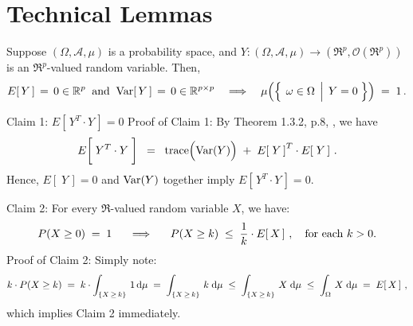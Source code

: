 

\section{Technical Lemmas}
\setcounter{theorem}{0}
\setcounter{equation}{0}

\renewcommand{\theenumi}{\roman{enumi}}
\renewcommand{\labelenumi}{\textnormal{(\theenumi)}$\;\;$}

\begin{lemma}
\mbox{}\vskip 0.05cm
\noindent
Suppose $(\Omega,\mathcal{A},\mu)$ is a probability space, and
$Y : (\Omega,\mathcal{A},\mu) \longrightarrow (\Re^{p},\mathcal{O}(\Re^{p}))$
is an $\Re^{p}$-valued random variable.
Then,
\begin{equation*}
E\!\left[\,Y\,\right] \,=\, 0 \in \Re^{p}
\;\;\textnormal{and}\;\;
\Var\!\left[\,Y\,\right] \,=\, 0 \in \Re^{p \times p}
\quad\Longrightarrow\quad
\mu\!\left(\left\{\;\left.\omega\overset{{\color{white}.}}{\in}\Omega\,\;\right\vert\;Y = 0\;\right\}\right) \;=\;1\,.
\end{equation*}
\end{lemma}
\proof
\vskip 0.3cm
\noindent
\textnormal{Claim 1:}\quad
$E\!\left[\,Y^{T}\cdot Y\,\right] = 0$
\vskip 0.3cm
\noindent
Proof of Claim 1:\quad
By Theorem 1.3.2, p.8, \cite{Christensen2011}, we have
\begin{equation*}
E\!\left[\;Y^{T} \overset{{\color{white}\vert}}{\cdot} Y\;\right]
\;\; = \;\;
	\trace\!\left(\Var(\overset{{\color{white}.}}{Y})\right)
	\; + \;
	E\!\left[\;Y\,\right]^{T} \cdot E\!\left[\;Y\,\right]\,.
\end{equation*}
Hence, $E\!\left[\;Y\,\right] = 0$ and $\textnormal{Var}(Y)$ together imply $E\!\left[\,Y^{T}\cdot Y\,\right] = 0$.

\vskip 0.5cm
\noindent
\textnormal{Claim 2:}\quad
For every $\Re$-valued random variable $X$, we have:
\begin{equation*}
P(X \geq 0) \;=\; 1
\quad\;\;\Longrightarrow\quad\;\;
P(X \geq k) \;\leq\; \dfrac{1}{k}\cdot E\!\left[\,X\,\right]\,,
\quad
\textnormal{for each $k > 0$}.
\end{equation*}
Proof of Claim 2:\quad
Simply note:
\begin{equation*}
k \cdot P(X \geq k)
\;=\; k\cdot\int_{\{X\,\geq\,k\}}\,1\,\textnormal{d}\mu
\;=\; \int_{\{X\,\geq\,k\}}\,k\;\textnormal{d}\mu
\;\leq\; \int_{\{X\,\geq\,k\}}\,X\;\textnormal{d}\mu
\;\leq\; \int_{\Omega}\,X\;\textnormal{d}\mu
\;=\; E\!\left[\,X\,\right]\,,
\end{equation*}
which implies Claim 2 immediately.

